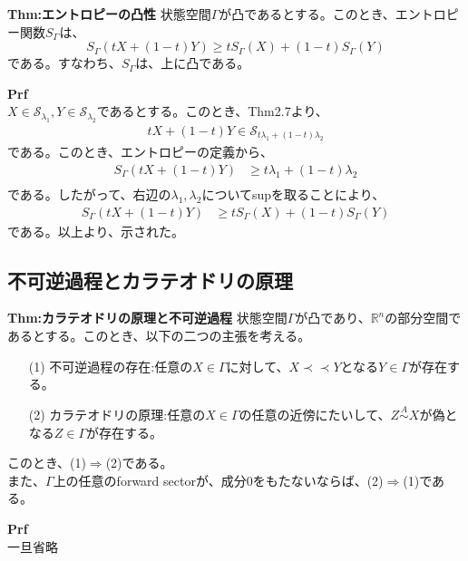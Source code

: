 \documentclass[a4paper,11pt]{jsarticle}
\numberwithin{equation}{section}
\begin{document}
\begin{itembox}[l]{\textbf{Thm:エントロピーの凸性}}
    状態空間$\Gamma$が凸であるとする。このとき、エントロピー関数$S_{\Gamma}$は、
    \begin{equation}
        S_{\Gamma}(tX+(1-t)Y) \geq tS_{\Gamma}(X)+(1-t)S_{\Gamma}(Y)
    \end{equation}
    である。すなわち、$S_{\Gamma}$は、上に凸である。
\end{itembox}
\textbf{Prf}\\
$X \in \mathcal{S}_{\lambda_1},Y \in \mathcal{S}_{\lambda_2}$であるとする。このとき、Thm2.7より、
\begin{align}
    tX+(1-t)Y \in \mathcal{S}_{t\lambda_1+(1-t)\lambda_2}
\end{align}
である。このとき、エントロピーの定義から、
\begin{align}
    S_{\Gamma}(tX+(1-t)Y) &\geq t\lambda_1+(1-t)\lambda_2\\
\end{align}
である。したがって、右辺の$\lambda_1,\lambda_2$についてsupを取ることにより、
\begin{align}
    S_{\Gamma}(tX+(1-t)Y) &\geq tS_{\Gamma}(X)+(1-t)S_{\Gamma}(Y)
\end{align}
である。以上より、示された。\hfill\qedsymbol\\

\subsection{不可逆過程とカラテオドリの原理}
\begin{itembox}[l]{\textbf{Thm:カラテオドリの原理と不可逆過程}}
    状態空間$\Gamma$が凸であり、$\mathbb{R}^n$の部分空間であるとする。このとき、以下の二つの主張を考える。
    \begin{itemize}
        \item[(1)] 不可逆過程の存在:任意の$X \in \Gamma$に対して、$X \prec \prec Y$となる$Y \in \Gamma$が存在する。
        \item[(2)] カラテオドリの原理:任意の$X \in \Gamma$の任意の近傍にたいして、$Z \overset{A}{\sim} X$が偽となる$Z \in \Gamma$が存在する。 
    \end{itemize}
    このとき、(1)$\Rightarrow$(2)である。\\
また、$\Gamma$上の任意のforward sectorが、成分0をもたないならば、(2)$\Rightarrow$(1)である。
\end{itembox}
\textbf{Prf}\\
一旦省略\\
\end{document}
